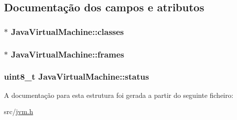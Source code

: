 \subsection{Documentação dos campos e atributos}
\subsubsection[{\texorpdfstring{classes}{classes}}]{$\ast$ Java\+Virtual\+Machine\+::classes}\hypertarget{structJavaVirtualMachine_a36266aec8ba9d25b4d9f67509967dd4c}{}\label{structJavaVirtualMachine_a36266aec8ba9d25b4d9f67509967dd4c}
\subsubsection[{\texorpdfstring{frames}{frames}}]{$\ast$ Java\+Virtual\+Machine\+::frames}\hypertarget{structJavaVirtualMachine_a6a0d723bb649fabc57742221b01b3617}{}\label{structJavaVirtualMachine_a6a0d723bb649fabc57742221b01b3617}
\subsubsection[{\texorpdfstring{status}{status}}]{\setlength{\rightskip}{0pt plus 5cm}uint8\+\_\+t Java\+Virtual\+Machine\+::status}\hypertarget{structJavaVirtualMachine_ae8571f20c0db273c88a5ce2d52d51a04}{}\label{structJavaVirtualMachine_ae8571f20c0db273c88a5ce2d52d51a04}


A documentação para esta estrutura foi gerada a partir do seguinte ficheiro\+:\begin{DoxyCompactItemize}
\item 
src/\hyperlink{jvm_8h}{jvm.\+h}\end{DoxyCompactItemize}
